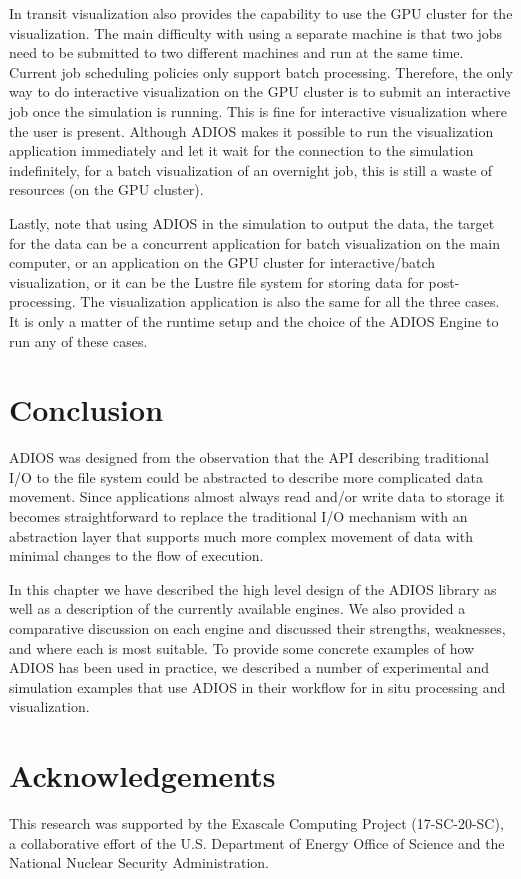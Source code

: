 \documentclass[x11names,table,xcdraw,graybox]{svmult}
\begin{document}
In transit visualization also provides the capability to use the GPU cluster for the visualization. The main difficulty with using a separate machine is that two jobs need to be submitted to two different machines and run at the same time.
Current job scheduling policies only support batch processing. Therefore, the only way to do interactive visualization on the GPU cluster is to submit an interactive job once the simulation is running.
This is fine for interactive visualization where the user is present. Although ADIOS makes it possible to run the visualization application immediately and let it wait for the connection to the simulation indefinitely, for a batch visualization of an overnight job, this is still a waste of resources (on the GPU cluster).

Lastly, note that using ADIOS in the simulation to output the data, the target for the data can be a concurrent application for batch visualization on the main computer, or an application on the GPU cluster for interactive/batch visualization, or it can be the Lustre file system for storing data for post-processing. The visualization application is also the same for all the three cases. It is only a matter of the runtime setup and the choice of the ADIOS Engine to run any of these cases.

%
\section{Conclusion}
\label{sec:conclusion}

ADIOS was designed from the observation that the API describing traditional I/O to the file system could be abstracted to describe more complicated data movement.
Since applications almost always read and/or write data to storage it becomes straightforward to replace the traditional I/O mechanism with an abstraction layer that supports much more complex movement of data with minimal changes to the flow of execution.

In this chapter we have described the high level design of the ADIOS library as well as a description of the currently available engines. We also provided a comparative discussion on each engine and discussed their strengths, weaknesses, and where each is most suitable. To provide some concrete examples of how ADIOS has been used in practice, we described a number of experimental and simulation examples that use ADIOS in their workflow for in situ processing and visualization.

\section{Acknowledgements}

This research was supported by the Exascale Computing Project (17-SC-20-SC), a collaborative effort of the U.S. Department of Energy Office of Science and the National Nuclear Security Administration.


%


\end{document}
